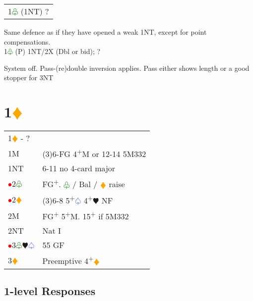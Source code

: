 \documentclass{article}
\renewcommand{\sp}{\textcolor{RoyalBlue}{$\varspade$}}
\newcommand{\he}{\textcolor{RubineRed}{$\varheart$}}
\newcommand{\di}{\textcolor{Orange}{$\vardiamond$}}
\newcommand{\cl}{\textcolor{Green}{$\varclub$}}
\newcommand{\nt}{\relsize{-1}NT\relsize{1}}
\newcommand{\up}{\textsuperscript{+}}
\newcommand{\al}{\textcolor{red}{$\bullet$}}
\begin{document}
\medskip

\begin{tabular}{|l|p{6.5cm}}
	\multicolumn{2}{l}{1\cl{} (1\nt{}) ?}\\
\end{tabular}

Same defence as if they have opened a weak 1\nt{}, except for point compensations.\\

1\cl{} (P) 1\nt{}/2X (Dbl or bid); ?

System off. Pass-(re)double inversion applies. Pass either shows length or a good stopper for 3\nt{}

\section{1\di{}}

\begin{tabular}{|l|p{6.5cm}}
	\multicolumn{2}{l}{1\di{} - ?}\\
		1M & (3)6-FG 4\up{}M or 12-14 5M332 \\
		1\nt & 6-11 no 4-card major \\
		\al{}2\cl{} & FG\up{}. \cl{} / Bal / \di{} raise \\
		\al{}2\di{} & (3)6-8 5\up{}\sp{} 4\up{}\he{} NF \\
		2M & FG\up{} 5\up{}M. 15\up{} if 5M332 \\
		2\nt & Nat I \\
		\al{}3\cl{}\he{}\sp{} & 55 GF \\
		3\di{} & Preemptive 4\up\di{} \\
\end{tabular}

\subsection{1-level Responses}
\end{document}
